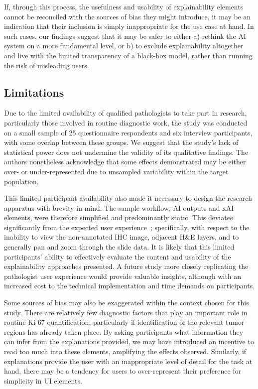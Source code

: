 \documentclass[final,5p,times,twocolumn,hyphens]{elsarticle}
\begin{document}
If, through this process, the usefulness and usability of explainability elements cannot be reconciled with the sources of bias they might introduce, it may be an indication that their inclusion is simply inappropriate for the use case at hand. In such cases, our findings suggest that it may be safer to either a) rethink the AI system on a more fundamental level, or b) to exclude explainability altogether and live with the limited transparency of a black-box model, rather than running the risk of misleading users.

\subsection{Limitations}

Due to the limited availability of qualified pathologists to take part in research, particularly those involved in routine diagnostic work, the study was conducted on a small sample of 25 questionnaire respondents and six interview participants, with some overlap between these groups. We suggest that the study's lack of statistical power does not undermine the validity of its qualitative findings. The authors nonetheless acknowledge that some effects demonstrated may be either over- or under-represented due to unsampled variability within the target population. 

This limited participant availability also made it necessary to design the research apparatus with brevity in mind. The sample workflow, AI outputs and xAI elements, were therefore simplified and predominantly static. This deviates significantly from the expected user experience~\cite{Kargl-et-al:2020:PathoWorkflows}; specifically, with respect to the inability to view the non-annotated IHC image, adjacent H\&E layers, and to generally pan and zoom through the slide data. It is likely that this limited participants' ability to effectively evaluate the content and usability of the explainability approaches presented. A future study more closely replicating the pathologist user experience would provide valuable insights, although with an increased cost to the technical implementation and time demands on participants.

Some sources of bias may also be exaggerated within the context chosen for this study. There are relatively few diagnostic factors that play an important role in routine Ki-67 quantification, particularly if identification of the relevant tumor regions has already taken place. By asking participants what information they can infer from the explanations provided, we may have introduced an incentive to read too much into these elements, amplifying the effects observed. Similarly, if explanations provide the user with an inappropriate level of detail for the task at hand, there may be a tendency for users to over-represent their preference for simplicity in UI elements.
\end{document}
